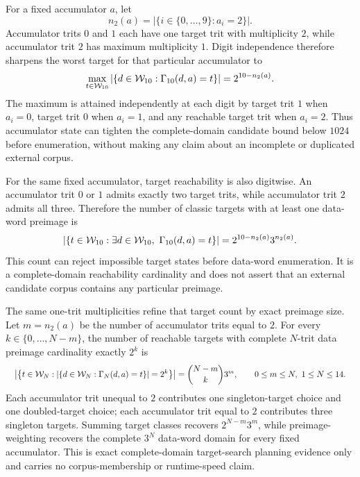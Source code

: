 \documentclass{article}
\newcommand{\fitmath}[1]{\resizebox{0.99\linewidth}{!}{$\displaystyle #1$}}
\begin{document}
For a fixed accumulator $a$, let
\[
  n_2(a)=\left|\{i\in\{0,\ldots,9\}:a_i=2\}\right|.
\]
Accumulator trits $0$ and $1$ each have one target trit with multiplicity $2$,
while accumulator trit $2$ has maximum multiplicity $1$. Digit independence
therefore sharpens the worst target for that particular accumulator to
\begin{equation}
  \max_{t\in\mathcal{W}_{10}}
    \left|\{d\in\mathcal{W}_{10}:\Gamma_{10}\!\left(d,a\right)=t\}\right|
      =2^{10-n_2(a)}.
  \label{eq:optimization-crazy-preimage-accumulator-bound}
\end{equation}
The maximum is attained independently at each digit by target trit $1$ when
$a_i=0$, target trit $0$ when $a_i=1$, and any reachable target trit when
$a_i=2$. Thus accumulator state can tighten the complete-domain candidate bound
below $1024$ before enumeration, without making any claim about an incomplete or
duplicated external corpus.

For the same fixed accumulator, target reachability is also digitwise. An
accumulator trit $0$ or $1$ admits exactly two target trits, while accumulator
trit $2$ admits all three. Therefore the number of classic targets with at
least one data-word preimage is
\begin{equation}
  \left|\left\{t\in\mathcal{W}_{10}:
    \exists d\in\mathcal{W}_{10},\ \Gamma_{10}\!\left(d,a\right)=t\right\}\right|
      =2^{10-n_2(a)}3^{n_2(a)}.
  \label{eq:optimization-crazy-reachable-target-count}
\end{equation}
This count can reject impossible target states before data-word enumeration.
It is a complete-domain reachability cardinality and does not assert that an
external candidate corpus contains any particular preimage.

The same one-trit multiplicities refine that target count by exact preimage
size. Let $m=n_2(a)$ be the number of accumulator trits equal to $2$. For every
$k\in\{0,\ldots,N-m\}$, the number of reachable targets with complete
$N$-trit data preimage cardinality exactly $2^k$ is
\begin{equation}
  \fitmath{%
    \left|\left\{t\in\WordDomain{N}:
      \left|\left\{d\in\WordDomain{N}:\CrazyN{N}{d}{a}=t\right\}\right|=2^k
    \right\}\right|
      =\binom{N-m}{k}3^m,
    \qquad 0\leq m\leq N,\ 1\leq N\leq14.
  }
  \label{eq:optimization-crazy-profile-fixed-accumulator-preimage-distribution}
\end{equation}
Each accumulator trit unequal to $2$ contributes one singleton-target choice
and one doubled-target choice; each accumulator trit equal to $2$ contributes
three singleton targets. Summing target classes recovers
$2^{N-m}3^m$, while preimage-weighting recovers the complete $3^N$ data-word
domain for every fixed accumulator. This is exact complete-domain target-search
planning evidence only and carries no corpus-membership or runtime-speed claim.
\end{document}

